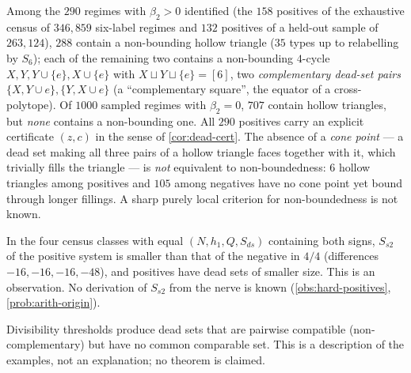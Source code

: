 \begin{observation}\label{obs:cycle-census}
Among the $290$ regimes with $\beta_2>0$ identified (the $158$ positives of the exhaustive census of $346{,}859$ six-label regimes and $132$ positives of a held-out sample of $263{,}124$), $288$ contain a non-bounding hollow triangle ($35$ types up to relabelling by $S_6$); each of the remaining two contains a non-bounding $4$-cycle $X,Y,Y\cup\{e\},X\cup\{e\}$ with $X\sqcup Y\sqcup\{e\}=[6]$, two \emph{complementary dead-set pairs} $\{X,Y\cup e\},\{Y,X\cup e\}$ (a ``complementary square'', the equator of a cross-polytope). Of $1000$ sampled regimes with $\beta_2=0$, $707$ contain hollow triangles, but \emph{none} contains a non-bounding one. All $290$ positives carry an explicit certificate $(z,c)$ in the sense of \cref{cor:dead-cert}.
The absence of a \emph{cone point} --- a dead set making all three pairs of a hollow triangle faces together with it, which trivially fills the triangle --- is \emph{not} equivalent to non-boundedness: $6$ hollow triangles among positives and $105$ among negatives have no cone point yet bound through longer fillings. A sharp purely local criterion for non-boundedness is not known.
\end{observation}
\begin{remark}
In the four census classes with equal $(N,h_1,Q,S_{ds})$ containing both signs, $S_{s2}$ of the positive system is smaller than that of the negative in $4/4$ (differences $-16,-16,-16,-48$), and positives have dead sets of smaller size. This is an observation. No derivation of $S_{s2}$ from the nerve is known (\cref{obs:hard-positives}, \cref{prob:arith-origin}).
\end{remark}
\begin{remark}
Divisibility thresholds produce dead sets that are pairwise compatible (non-complementary) but have no common comparable set. This is a description of the examples, not an explanation; no theorem is claimed.
\end{remark}

